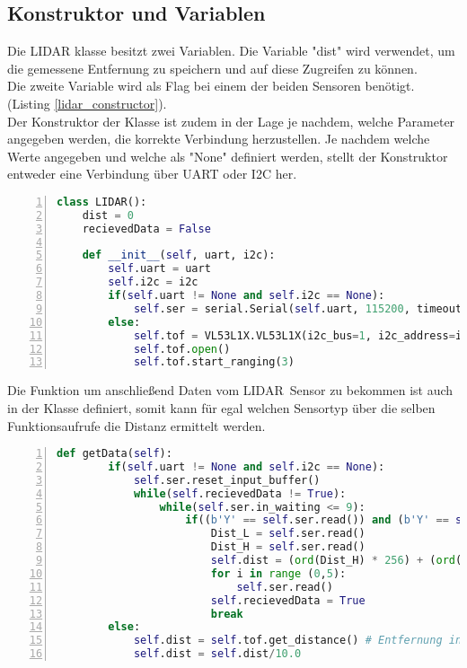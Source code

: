 \subsection{Konstruktor und Variablen}
Die LIDAR klasse besitzt zwei Variablen. Die Variable "dist" wird verwendet, um die gemessene Entfernung zu speichern und auf diese Zugreifen zu können.\\
Die zweite Variable wird als Flag bei einem der beiden Sensoren benötigt. (Listing \ref{lidar_constructor}).\\
Der Konstruktor der Klasse ist zudem in der Lage je nachdem, welche Parameter angegeben werden, die korrekte Verbindung herzustellen. Je nachdem welche Werte angegeben und welche als "None"  definiert werden, stellt der Konstruktor entweder eine Verbindung über \ac{UART} oder \ac{I2C} her. 
\begin{lstlisting}[caption={Kostruktor der Lidar Klasse}, language={Python}, label={lidar_constructor}, numbers=left]
class LIDAR():
    dist = 0
    recievedData = False

    def __init__(self, uart, i2c):
        self.uart = uart
        self.i2c = i2c
        if(self.uart != None and self.i2c == None):
            self.ser = serial.Serial(self.uart, 115200, timeout=1)
        else:
            self.tof = VL53L1X.VL53L1X(i2c_bus=1, i2c_address=i2c)
            self.tof.open()
            self.tof.start_ranging(3)
\end{lstlisting}
Die Funktion um anschließend Daten vom \ac{LIDAR} Sensor zu bekommen ist auch in der Klasse definiert, somit kann für egal welchen Sensortyp über die selben Funktionsaufrufe die Distanz ermittelt werden. 
\begin{lstlisting}[caption={Funktion um Distanz vom \ac{LIDAR} Sensor zu erhalten}, language={Python}, label={lidar_getData}, numbers=left]
	def getData(self):
        if(self.uart != None and self.i2c == None):
            self.ser.reset_input_buffer()
            while(self.recievedData != True):
                while(self.ser.in_waiting <= 9):
                    if((b'Y' == self.ser.read()) and (b'Y' == self.ser.read())):
                        Dist_L = self.ser.read()
                        Dist_H = self.ser.read()
                        self.dist = (ord(Dist_H) * 256) + (ord(Dist_L))
                        for i in range (0,5):
                            self.ser.read()
                        self.recievedData = True
                        break
        else:
            self.dist = self.tof.get_distance() # Entfernung in mm
            self.dist = self.dist/10.0
\end{lstlisting}
